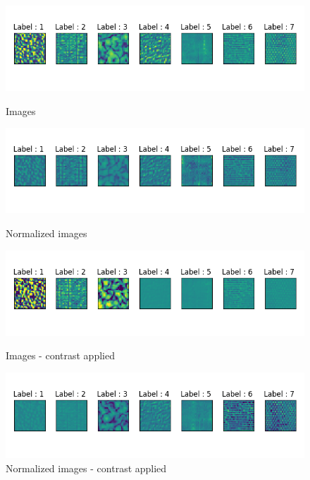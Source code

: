 \documentclass[12pt, english]{article}
\begin{document}
\begin{figure}[ht] 
  \label{fig:texture-families} 
  \begin{minipage}[b]{0.5\linewidth}
    \centering
    \includegraphics[width=.95\linewidth]{default.png} 
    \caption{Images} 
  \end{minipage}%
  \begin{minipage}[b]{0.5\linewidth}
    \centering
    \includegraphics[width=.95\linewidth]{normalized.png} 
    \caption{Normalized images} 
  \end{minipage} 
  \begin{minipage}[b]{0.5\linewidth}
    \centering
    \includegraphics[width=.95\linewidth]{default_contrast.png} 
    \caption{Images - contrast applied} 
  \end{minipage}%
  \begin{minipage}[b]{0.5\linewidth}
    \centering
    \includegraphics[width=.95\linewidth]{normalized_contrast.png} 
    \caption{Normalized images - contrast applied} 
  \end{minipage} 
\end{figure}
\end{document}
